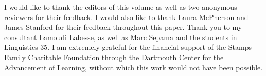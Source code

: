 \documentclass[output=paper,newtxmath,modfonts,nonflat,draftmode]{langsci/langscibook}
\begin{document}
I would like to thank the editors of this volume as well as two anonymous reviewers for their feedback. I would also like to thank Laura McPherson and James Stanford for their feedback throughout this paper. Thank you to my consultant Lamoudi Labesse, as well as Marc Sepama and the 
students in Linguistics 35. I am extremely grateful for the financial support of the Stamps Family Charitable Foundation through the Dartmouth Center for the Advancement of 
Learning, without which this work would not have been possible. 


\printbibliography[heading=subbibliography,notkeyword=this]
\end{document}
